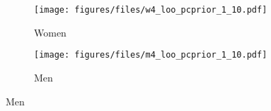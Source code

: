 \begin{figure}[htp]
\caption{PIT Distribution \newline Model \textit{Covariates} in Tables \ref{tbl:w_age_pcprior_1_10} and \ref{tbl:m_age_pcprior_1_10}}
\centering

  \begin{subfigure}[b]{.50\linewidth}
    \centering
       \caption{Women}
    \texttt{[image: figures/files/w4\_loo\_pcprior\_1\_10.pdf]}
  \end{subfigure}%

 \begin{subfigure}[b]{.50\linewidth}
   \caption{Men}
    \centering
    \texttt{[image: figures/files/m4\_loo\_pcprior\_1\_10.pdf]}
  \end{subfigure}%
  \label{fig:pit_loo_pcprior_1_10}
\end{figure}

